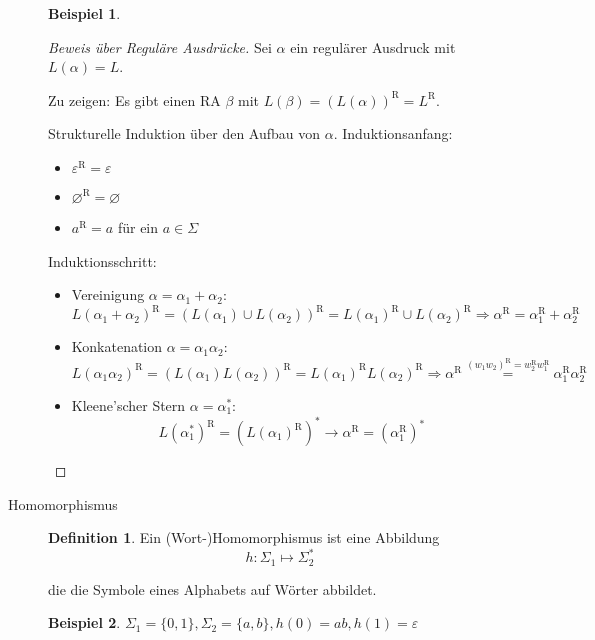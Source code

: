 \documentclass[11pt]{article} %
\theoremstyle{definition}
\newtheorem*{beispiel}{Beispiel}
\newtheorem{definition}{Definition}
\begin{document}
\begin{description}
\begin{beispiel}
\end{beispiel}

\begin{proof}[Beweis über Reguläre Ausdrücke]

Sei $\alpha$ ein regulärer Ausdruck mit $L(\alpha) = L$.

Zu zeigen: Es gibt einen RA $\beta$ mit $L(\beta) = (L(\alpha))^\textrm{R} = L^\textrm{R}$.

Strukturelle Induktion über den Aufbau von $\alpha$. Induktionsanfang:

\begin{itemize}
\item $\varepsilon^\textrm{R} = \varepsilon$
\item $\varnothing^\textrm{R} = \varnothing$
\item $a^\textrm{R} = a$ für ein $a \in \Sigma$
\end{itemize}

Induktionsschritt:
\begin{itemize}
\item Vereinigung $\alpha = \alpha_1 + \alpha_2$:
\[
L(\alpha_1 + \alpha_2)^\textrm{R} = (L(\alpha_1) \cup L(\alpha_2))^\textrm{R} = L(\alpha_1)^\textrm{R} \cup L(\alpha_2)^\textrm{R} \Rightarrow \alpha^\textrm{R} = \alpha_1^\textrm{R} + \alpha_2^\textrm{R}
\]
\item Konkatenation $\alpha = \alpha_1 \alpha_2$:
\[
L(\alpha_1 \alpha_2)^\textrm{R} =  (L(\alpha_1) L(\alpha_2))^\textrm{R} = L(\alpha_1)^\textrm{R} L(\alpha_2)^\textrm{R} \Rightarrow \alpha^\textrm{R} \overset{(w_1 w_2)^\textrm{R} = w_2^\textrm{R} w_1^\textrm{R}}{=} \alpha_1^\textrm{R} \alpha_2^\textrm{R}
\]
\item Kleene'scher Stern $\alpha = \alpha_1^*$:
\[
L(\alpha_1^*)^\textrm{R} = (L(\alpha_1)^\textrm{R})^* \rightarrow \alpha^\textrm{R} = (\alpha_1^\textrm{R})^*
\]
\end{itemize}

\end{proof}

\item[Homomorphismus]

\begin{definition} Ein (Wort-)Homomorphismus ist eine Abbildung
\[
h : \Sigma_1 \mapsto \Sigma_2^*
\]

die die Symbole eines Alphabets auf Wörter abbildet.
\end{definition}

\begin{beispiel}
$\Sigma_1 = \{0,1 \}, \Sigma_2 = \{a,b\}, h(0) = ab, h(1) = \varepsilon$
\end{beispiel}


\end{description}
\end{document}
